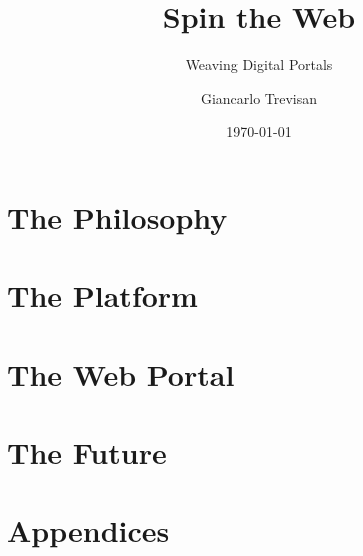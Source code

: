 \documentclass[11pt,openright,twoside,a4paper]{book}
\title{Spin the Web}
\subtitle{Weaving Digital Portals}
\author{Giancarlo Trevisan}
\date{\today}
\begin{document}
\frontmatter






\setcounter{tocdepth}{0}
\tableofcontents

\mainmatter

\part{The Philosophy}






\part{The Platform}









\part{The Web Portal}




\part{The Future}



\part*{Appendices}
\appendix




\backmatter
\nocite{*}


\printglossary
\printindex
\end{document}
